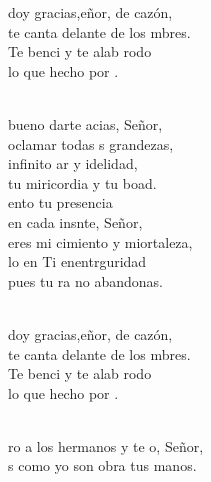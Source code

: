 \documentclass[12pt]{article}
\begin{document}
\begin{multicols*}{2}
\begin{cancion}%
	\begin{chorus}%
	 doy gracias,eñor, de cazón,\\
	te canta delante de los mbres. \\
	Te benci y te alab rodo \\
	lo que  hecho por . \\
	\end{chorus}%
	\jump\\
	 bueno darte acias, Señor,\\
	oclamar todas s grandezas,\\
	 infinito ar y idelidad,\\
	tu miricordia y tu boad.\\
	ento tu presencia \\
	en cada insnte, Señor,\\
	eres mi cimiento y miortaleza,\\
	lo en Ti enentrguridad\\
	pues tu ra no abandonas. \\\jump\\
	\begin{chorus}%
	 doy gracias,eñor, de cazón,\\
	te canta delante de los mbres. \\
	Te benci y te alab rodo \\
	lo que  hecho por . \\
	\end{chorus}%
	\jump\\
	ro a los hermanos y te o, Señor,\\
	s como yo son obra  tus manos.\\

\end{cancion}
\end{multicols*}
\end{document}
